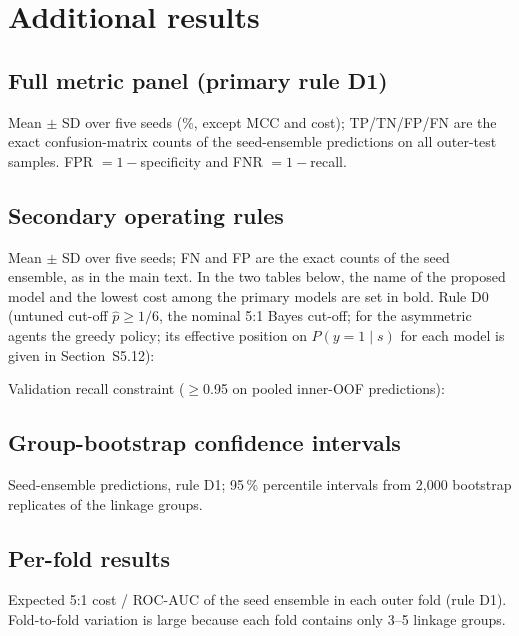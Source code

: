 \section{Additional results}
\label{sec:s-results}

\subsection{Full metric panel (primary rule D1)}
Mean $\pm$ SD over five seeds (\%, except MCC and cost); TP/TN/FP/FN are the exact confusion-matrix counts of the seed-ensemble predictions on all \nSamplesEval{} outer-test samples. FPR $=1-$specificity and FNR $=1-$recall.

\noindent\resizebox{\textwidth}{!}{}

\subsection{Secondary operating rules}
Mean $\pm$ SD over five seeds; FN and FP are the exact counts of the seed ensemble, as in the main text. In the two tables below, the name of the proposed model and the lowest cost among the primary models are set in bold. Rule D0 (untuned cut-off $\hat p\ge 1/6$, the nominal 5:1 Bayes cut-off; for the asymmetric agents the greedy policy; its effective position on $P(y=1\mid s)$ for each model is given in Section~S5.12):

\noindent\resizebox{\textwidth}{!}{}

\medskip
Validation recall constraint ($\ge$0.95 on pooled inner-OOF predictions):

\noindent\resizebox{\textwidth}{!}{}

\subsection{Group-bootstrap confidence intervals}
Seed-ensemble predictions, rule D1; 95\,\% percentile intervals from 2,000 bootstrap replicates of the \nGroupsEval{} linkage groups.

\noindent\resizebox{\textwidth}{!}{}

\subsection{Per-fold results}
Expected 5:1 cost / ROC-AUC of the seed ensemble in each outer fold (rule D1). Fold-to-fold variation is large because each fold contains only 3--5 linkage groups.

